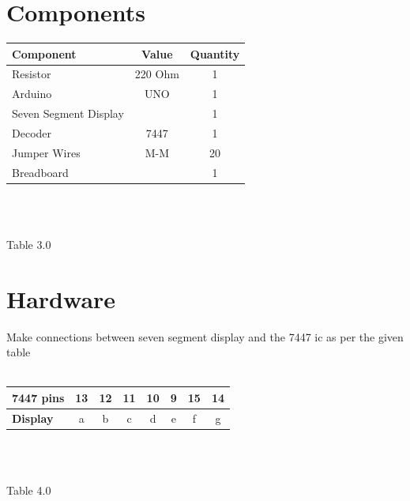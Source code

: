 \documentclass[journal,12pt,twocolumn]{IEEEtran}
\begin{document}
\section{Components}
\centering
\begin{tabular}{|l|c|c|}
\hline
Component & Value & Quantity\\
\hline
Resistor & 220 Ohm & 1\\
\hline
Arduino & UNO & 1\\
\hline
Seven Segment Display & & 1\\
\hline
Decoder & 7447 & 1\\
\hline
Jumper Wires & M-M & 20\\
\hline
Breadboard & & 1\\
\hline
\end{tabular}\\
\
\centerline{Table 3.0}

\section{Hardware}
\raggedright
Make connections between seven segment display and the 7447 ic as per the given table\\
\
\centering
\\\begin{tabular}{|l|c|c|c|c|c|c|c|}
\hline
\textbf{7447 pins} & 13 & 12 & 11 & 10 & 9 & 15 & 14\\
\hline
\textbf{Display} & a & b & c & d & e & f & g\\
\hline
\end{tabular}\\
\
\centerline{Table 4.0}
\end{document}
